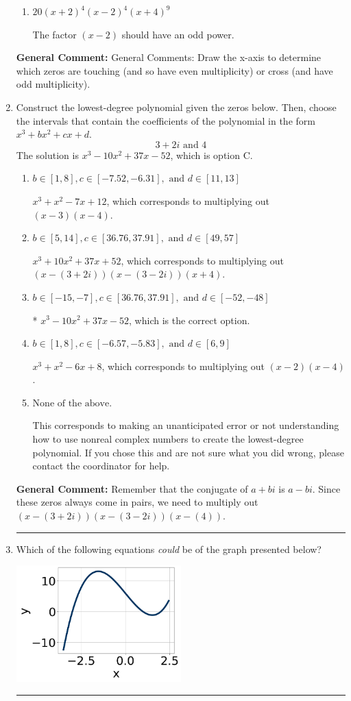 \documentclass{extbook}[14pt]
\newcommand{\litem}[1]{\item #1

\rule{\textwidth}{0.4pt}}
\begin{document}
\begin{enumerate}
{\begin{enumerate}[label=\Alph*.]
The factor $-2$ should have an even power and the factor $2$ should have an odd power.
\item \( 20(x + 2)^{4} (x - 2)^{4} (x + 4)^{9} \)

The factor $(x - 2)$ should have an odd power.
\end{enumerate}

\textbf{General Comment:} General Comments: Draw the x-axis to determine which zeros are touching (and so have even multiplicity) or cross (and have odd multiplicity).
}
\litem{
Construct the lowest-degree polynomial given the zeros below. Then, choose the intervals that contain the coefficients of the polynomial in the form $x^3+bx^2+cx+d$.
\[ 3 + 2 i \text{ and } 4 \]The solution is \( x^{3} -10 x^{2} +37 x -52 \), which is option C.\begin{enumerate}[label=\Alph*.]
\item \( b \in [1, 8], c \in [-7.52, -6.31], \text{ and } d \in [11, 13] \)

$x^{3} + x^{2} -7 x + 12$, which corresponds to multiplying out $(x -3)(x -4)$.
\item \( b \in [5, 14], c \in [36.76, 37.91], \text{ and } d \in [49, 57] \)

$x^{3} +10 x^{2} +37 x + 52$, which corresponds to multiplying out $(x-(3 + 2 i))(x-(3 - 2 i))(x + 4)$.
\item \( b \in [-15, -7], c \in [36.76, 37.91], \text{ and } d \in [-52, -48] \)

* $x^{3} -10 x^{2} +37 x -52$, which is the correct option.
\item \( b \in [1, 8], c \in [-6.57, -5.83], \text{ and } d \in [6, 9] \)

$x^{3} + x^{2} -6 x + 8$, which corresponds to multiplying out $(x -2)(x -4)$.
\item \( \text{None of the above.} \)

This corresponds to making an unanticipated error or not understanding how to use nonreal complex numbers to create the lowest-degree polynomial. If you chose this and are not sure what you did wrong, please contact the coordinator for help.
\end{enumerate}

\textbf{General Comment:} Remember that the conjugate of $a+bi$ is $a-bi$. Since these zeros always come in pairs, we need to multiply out $(x-(3 + 2 i))(x-(3 - 2 i))(x-(4))$.
}
\litem{
Which of the following equations \textit{could} be of the graph presented below?

\begin{center}
    \includegraphics[width=0.5\textwidth]{../Figures/polyGraphToFunctionCopyB.png}
\end{center}


}
\end{enumerate}
\end{document}
